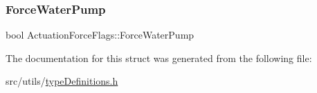 \subsubsection{\texorpdfstring{Force\+Water\+Pump}{ForceWaterPump}}
{\footnotesize\ttfamily bool Actuation\+Force\+Flags\+::\+Force\+Water\+Pump}



The documentation for this struct was generated from the following file\+:\begin{DoxyCompactItemize}
\item 
src/utils/\hyperlink{typeDefinitions_8h}{type\+Definitions.\+h}\end{DoxyCompactItemize}
